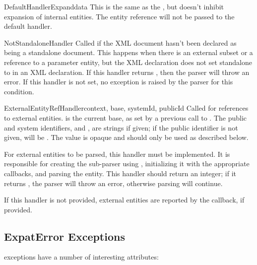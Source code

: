 \begin{methoddesc}[xmlparser]{DefaultHandlerExpand}{data}
This is the same as the , 
but doesn't inhibit expansion of internal entities.
The entity reference will not be passed to the default handler.
\end{methoddesc}

\begin{methoddesc}[xmlparser]{NotStandaloneHandler}{} Called if the
XML document hasn't been declared as being a standalone document.
This happens when there is an external subset or a reference to a
parameter entity, but the XML declaration does not set standalone to
 in an XML declaration.  If this handler returns ,
then the parser will throw an 
error.  If this handler is not set, no exception is raised by the
parser for this condition.
\end{methoddesc}

\begin{methoddesc}[xmlparser]{ExternalEntityRefHandler}{context, base,
                                                        systemId, publicId}
Called for references to external entities.   is the current
base, as set by a previous call to .  The public and
system identifiers,  and , are strings if
given; if the public identifier is not given,  will be
.  The  value is opaque and should only be
used as described below.

For external entities to be parsed, this handler must be implemented.
It is responsible for creating the sub-parser using
, initializing it with
the appropriate callbacks, and parsing the entity.  This handler
should return an integer; if it returns , the parser will
throw an  error,
otherwise parsing will continue.

If this handler is not provided, external entities are reported by the
 callback, if provided.
\end{methoddesc}


\subsection{ExpatError Exceptions \label{expaterror-objects}}

 exceptions have a number of interesting
attributes:


